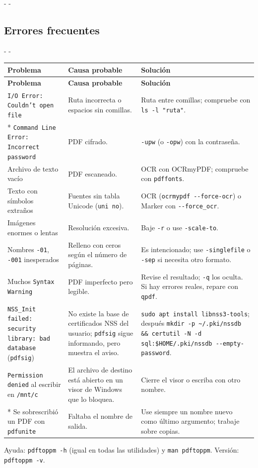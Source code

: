 \documentclass[11pt,a4paper]{article}
\makeatletter
\newcommand{\necesitaespacio}[1]{\par\penalty-100\begingroup
	\setlength{\dimen@}{#1}\dimen@ii\pagegoal\advance\dimen@ii-\pagetotal
	\ifdim\dimen@>\dimen@ii\ifdim\dimen@ii>\z@\vfil\fi\penalty-\@M\fi\endgroup}
\newenvironment{errores}{%
	\par\begingroup\small
	\begin{longtable}{L{4.1cm}L{4.9cm}L{6.0cm}}
		\toprule\rowcolor{tablacab}\cab{Problema} & \cab{Causa probable} & \cab{Solución} \\ \midrule
		\endfirsthead
		\toprule\rowcolor{tablacab}\cab{Problema} & \cab{Causa probable} & \cab{Solución} \\ \midrule
		\endhead
		\bottomrule
		\endfoot}
	{\end{longtable}\endgroup}
\newcommand{\cmd}[1]{\texttt{\textcolor{colcmd}{#1}}}      %
\newcommand{\opt}[1]{\texttt{\textcolor{colopt}{#1}}}      %
\newcommand{\arch}[1]{\texttt{\textcolor{colarch}{#1}}}    %
\newcommand{\cab}[1]{\textbf{#1}}
\newcommand{\tl}{\textasciitilde{}}  %
\makeatother
\begin{document}
	\necesitaespacio{14\baselineskip}
	\subsection{Errores frecuentes}
	
	\necesitaespacio{10\baselineskip}
	\begin{errores}
		\texttt{I/\allowbreak{}O Error: Couldn't open file} & Ruta incorrecta o espacios sin comillas. & Ruta entre comillas; compruebe con \cmd{ls -l "ruta"}.\\*
		\texttt{Command Line Error: Incorrect password} & PDF cifrado. & \opt{-upw} (o \opt{-opw}) con la contraseña.\\
		Archivo de texto vacío & PDF escaneado. & OCR con OCRmyPDF; compruebe con \cmd{pdffonts}.\\
		Texto con símbolos extraños & Fuentes sin tabla Unicode (\texttt{uni no}). & OCR (\cmd{ocrmypdf -{}-force-\allowbreak{}ocr}) o Marker con \opt{-{}-force\_ocr}.\\
		Imágenes enormes o lentas & Resolución excesiva. & Baje \opt{-r} o use \opt{-scale-to}.\\
		Nombres \arch{-01}, \arch{-001} inesperados & Relleno con ceros según el número de páginas. & Es intencionado; use \opt{-singlefile} o \opt{-sep} si necesita otro formato.\\
		Muchos \texttt{Syntax Warning} & PDF imperfecto pero legible. & Revise el resultado; \opt{-q} los oculta. Si hay errores reales, repare con \cmd{qpdf}.\\
		\texttt{NSS\_Init failed: security library: bad database} (\cmd{pdfsig}) & No existe la base de certificados NSS del usuario; \cmd{pdfsig} sigue informando, pero muestra el aviso. & \cmd{sudo apt install libnss3-\allowbreak{}tools}; después \cmd{mkdir -p \tl/.pki/nssdb \&\& certutil -N -d sql:\$HOME/.pki/nssdb -{}-empty-\allowbreak{}password}.\\
		\texttt{Permission denied} al escribir en \arch{/mnt/c} & El archivo de destino está abierto en un visor de Windows que lo bloquea. & Cierre el visor o escriba con otro nombre.\\*
		Se sobrescribió un PDF con \cmd{pdfunite} & Faltaba el nombre de salida. & Use siempre un nombre nuevo como último argumento; trabaje sobre copias.\\
	\end{errores}
	
	Ayuda: \cmd{pdftoppm -h} (igual en todas las utilidades) y \cmd{man pdftoppm}. Versión: \cmd{pdftoppm -v}.
	\clearpage
\end{document}
